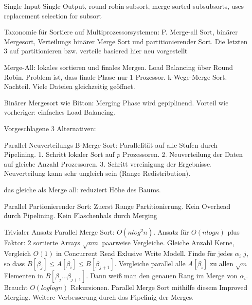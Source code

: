 \documentclass[a4paper,12pt,twoside]{article}
\begin{document}
\textbf{}

Single Input Single Output, round robin subsort, merge sorted subsubsorts, uses replacement selection for subsort

\textbf{}

Taxonomie für Sortiere auf Multiprozessorsystemen: P. Merge-all Sort, binärer Mergesort, Verteilungs binärer Merge Sort und partitionierender Sort. Die letzten 3 auf partitionieren bzw. verteile basiered hier neu vorgestellt

Merge-All: lokales sortieren und finales Mergen. Load Balancing über Round Robin. Problem ist, dass finale Phase nur 1 Prozessor. k-Wege-Merge Sort. Nachteil. Viele Dateien gleichzeitig geöffnet.

Binärer Mergesort wie Bitton: Merging Phase wird gepiplinend. Vorteil wie vorheriger: einfaches Load Balancing.

Vorgeschlagene 3 Alternativen:

Parallel Neuverteilungs B-Merge Sort: Parallelität auf alle Stufen durch Pipelining. 1. Schritt lokaler Sort auf $p$ Prozessoren. 2. Neuverteilung der Daten auf gleiche Anzahl Prozessoren. 3. Schritt vereinigung der Ergebnisse. Neuverteilung kann sehr ungleich sein (Range Redistribution).

das gleiche als Merge all: reduziert Höhe des Baums.

Parallel Partionierender Sort: Zuerst Range Partitionierung. Kein Overhead durch Pipelining. Kein Flaschenhals durch Merging

\textbf{}

\textbf{}

\textbf{}

\textbf{}

\textbf{}

\textbf{}

Trivialer Ansatz Parallel Merge Sort: $O(n log^{2} n)$. Ansatz für $O(n log n)$ plus Faktor: 2 sortierte Arrays $\sqrt{nm}$ paarweise Vergleiche. Gleiche Anzahl Kerne, Vergleich $O(1)$ in Concurrent Read Exlusive Write Modell. Finde für jedes $\alpha_i$ $j$, so dass $B[\beta_j] \leq A[\beta_i] \leq B[\beta_{j+1}]$. Vergleiche parallel alle $A[\beta_i]$ zu allen $\sqrt{m}$ Elementen in $B[\beta_j\ldots\beta_{j+1}]$. Dann weiß man den genauen Rang im Merge von $\alpha_i$. Braucht $O(log log n)$ Rekursionen.
Parallel Merge Sort mithilfe diesem Improved Merging. Weitere Verbesserung durch das Pipelinig der Merges. 
\end{document}
